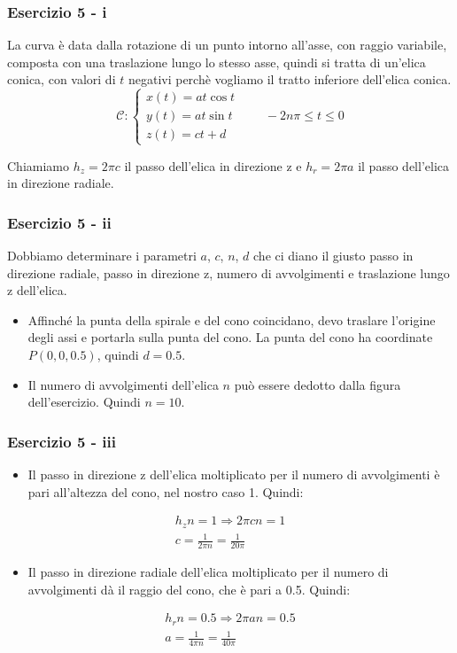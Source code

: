\documentclass{beamer}
\begin{document}
\begin{frame}
	\frametitle{Esercizio 5 - i}
La curva \`e data dalla rotazione di un punto intorno all'asse, con raggio
variabile, composta con una traslazione lungo lo stesso asse, quindi si tratta
di un'elica conica, con valori di $t$ negativi perch\`e vogliamo il tratto inferiore dell'elica conica.
	\begin{displaymath}
	\mathcal{C}:\begin{cases}
	x(t)= at\cos t\\
	y(t)=at \sin t\\
	z(t)= ct + d
	\end{cases}
	\qquad -2 n \pi \leq t\leq 0
	\end{displaymath}
	
        Chiamiamo $h_z = 2 \pi c$ il passo dell'elica in direzione z e $h_{r} = 2 \pi a$ il passo dell'elica in direzione radiale.
\end{frame}

\begin{frame}
	\frametitle{Esercizio 5 - ii}
        Dobbiamo determinare i parametri $a$, $c$, $n$, $d$ che ci diano il giusto passo in direzione radiale, passo in direzione z,
        numero di avvolgimenti e traslazione lungo z dell'elica.
	\begin{itemize}
		\item Affinch\'e la punta della spirale e del cono coincidano, devo traslare l'origine degli assi e portarla sulla punta del cono. La punta del
                    cono ha coordinate $P(0, 0, 0.5)$, quindi $d = 0.5$.
		\item Il numero di avvolgimenti dell'elica $n$ pu\`o essere dedotto dalla figura dell'esercizio. Quindi $n = 10$.
	\end{itemize}
\end{frame}

\begin{frame}
	\frametitle{Esercizio 5 - iii}
	\begin{itemize}
		\item Il passo in direzione z dell'elica moltiplicato per il numero di avvolgimenti \`e pari all'altezza del cono, nel nostro caso 1. Quindi:
	\end{itemize}
                \begin{gather*}
		h_z n = 1 \Rightarrow 2 \pi c n = 1  \\
                c = \frac{1}{2 \pi n} = \frac{1}{20 \pi}
                \end{gather*}
	\begin{itemize}
		\item Il passo in direzione radiale dell'elica moltiplicato per il numero di avvolgimenti dà il raggio del cono, che è pari a 0.5. Quindi:
	\end{itemize}
		\begin{align*} 
		h_r n = 0.5 \Rightarrow 2 \pi a n = 0.5 \\
                    a = \frac{1}{4 \pi n} = \frac{1}{40 \pi}
		\end{align*}
\end{frame}
\end{document}
